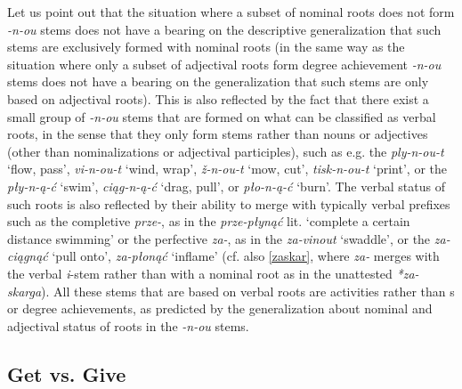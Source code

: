 \noindent
Let us point out that the situation where a subset of nominal roots does not form   \textit{-n-ou} stems does not have a bearing on the descriptive generalization that such stems are exclusively formed with nominal roots (in the same way as the situation where only a subset of adjectival roots form  degree achievement \textit{-n-ou} stems does not have a bearing on the generalization that such stems are only based on adjectival roots).
This is also reflected by the fact that there exist a small group of \textit{-n-ou} stems that are formed on what can be classified as verbal roots, in the sense that they only form  stems rather than nouns or adjectives (other than nominalizations or adjectival participles), such as e.g. the  \textit{ply-n-ou-t} `flow, pass', \textit{vi-n-ou-t} `wind, wrap', \textit{\v{z}-n-ou-t} `mow, cut', \textit{tisk-n-ou-t} `print', or the  \textit{p\l y-n-\k{a}-\'c} `swim',  \textit{ci\k{a}g-n-\k{a}-\'c} `drag, pull', or \textit{p\l o-n-\k{a}-\'c} `burn'. The verbal status of such roots is also reflected by their ability to merge with typically verbal prefixes such as the completive \textit{prze-}, as in the  \textit{prze-p\l yn\k{a}\'c} lit. `complete a certain distance swimming' or the perfective \textit{za-}, as in the  \textit{za-vinout} `swaddle', or the  \textit{za-ci\k{a}gn\k{a}\'c} `pull onto', \textit{za-p\l on\k{a}\'c} `inflame' (cf. also \ref{zaskar}, where \textit{za-} merges with the verbal \textit{i}-stem rather than with a nominal root as in the unattested \textit{*za-skarga}). All these stems that are based on verbal roots are activities rather than s or degree achievements, as predicted by the generalization about nominal and adjectival status of roots in the \textit{-n-ou} stems.  

\subsection{Get vs. Give}

